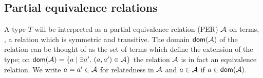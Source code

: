 \documentclass[acmlarge,review,anonymous]{acmart}\settopmatter{printfolios=true}
\begin{document}



\subsection{Partial equivalence relations}
\label{sec:per}

A type $T$ will be interpreted as a partial equivalence relation (PER) $\mathcal{A}$ on terms, \ie, a relation which is symmetric and transitive. The domain $\mathop{\mathsf{dom}}\nolimits(\mathcal{A})$ of the relation can be thought of as the set of terms which define the extension of the type; on $\mathop{\mathsf{dom}}\nolimits(\mathcal{A}) = \{a \mid \exists a'.\ (a,a') \in \mathcal{A} \}$ the relation $\mathcal{A}$ is in fact an equivalence relation.  We write $a = a' \in \mathcal{A}$ for relatedness in $\mathcal{A}$ and $a \in \mathcal{A}$ if $a \in \mathop{\mathsf{dom}}\nolimits(\mathcal{A})$.
\end{document}
